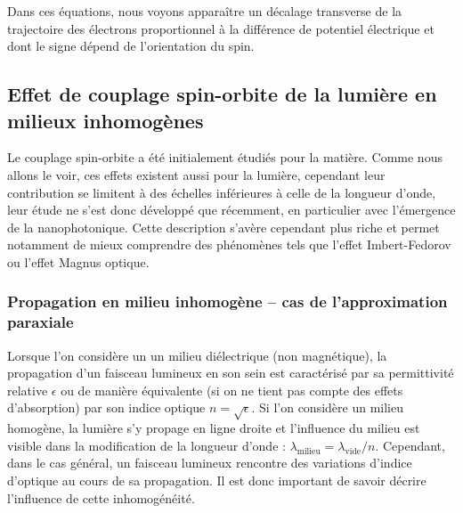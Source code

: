 \documentclass[a4paper,11pt]{article} %
\begin{document}
	Dans ces équations, nous voyons apparaître un décalage transverse de la trajectoire des électrons proportionnel à la différence de potentiel électrique et dont le signe dépend de l'orientation du spin.
	
	
	\subsection{Effet de couplage spin-orbite de la lumière en milieux inhomogènes}
	Le couplage spin-orbite a été initialement étudiés pour la matière. Comme nous allons le voir, ces effets existent aussi pour la lumière, cependant leur contribution se limitent à des échelles inférieures à celle de la longueur d'onde, leur étude ne s'est donc développé que récemment, en particulier avec l'émergence de la nanophotonique. Cette description s'avère cependant plus riche et permet notamment de mieux comprendre des phénomènes tels que l'effet Imbert-Fedorov ou l'effet Magnus optique.\\
	
	
	\subsubsection{Propagation en milieu inhomogène -- cas de l'approximation paraxiale}
	Lorsque l'on considère un un milieu diélectrique (non magnétique), la propagation d'un faisceau lumineux en son sein est caractérisé par sa permittivité relative $ \epsilon $ ou de manière équivalente (si on ne tient pas compte des effets d'absorption) par son indice optique $ n = \sqrt{\epsilon} $. Si l'on considère un milieu homogène, la lumière s'y propage en ligne droite et l'influence du milieu est visible dans la modification de la longueur d'onde : $ \lambda_\text{milieu} = \lambda_\text{vide} / n $. Cependant, dans le cas général, un faisceau lumineux rencontre des variations d'indice d'optique au cours de sa propagation. Il est donc important de savoir décrire l'influence de cette inhomogénéité.\\
	
\end{document}
